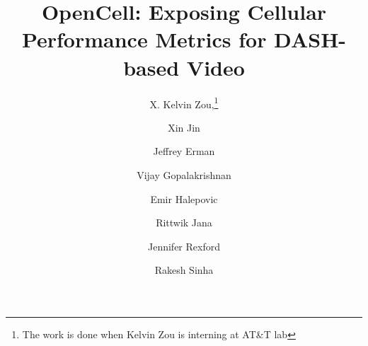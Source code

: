 \documentclass{sig-alternate-10pt}
\begin{document}
\title{OpenCell: Exposing Cellular Performance Metrics for DASH-based Video}
\author[1]{\large X. Kelvin Zou,\thanks{The work is done when Kelvin Zou is interning at AT\&T lab} }
\author[1]{\large Xin Jin}
\author[2]{\large Jeffrey Erman}
\author[2]{\large Vijay Gopalakrishnan}
\author[2]{\large Emir Halepovic}
\author[2]{\large Rittwik Jana}
\author[1]{\large Jennifer Rexford}
\author[2]{\large Rakesh Sinha}
 
 


\maketitle








 
 

{\small
} 
\end{document}
